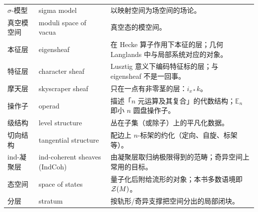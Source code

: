 \begin{longtable}{p{}p{}p{}}
$\sigma$-模型 & sigma model & 以映射空间为场空间的场论。\\
真空模空间 & moduli space of vacua & 真空态的模空间。\\
本征层 & eigensheaf & 在 Hecke 算子作用下本征的层；几何 Langlands 中与局部系统对应的对象。\\
特征层 & character sheaf & Lusztig 意义下编码特征标的层；与 eigensheaf 不是一回事。\\
摩天层 & skyscraper sheaf & 只在一点有非零茎的层：$i_{x*}k$。\\
操作子 & operad & 描述「$n$ 元运算及其复合」的代数结构；$\mathbb{E}_n$ 即小 $n$ 圆盘操作子。\\
级结构 & level structure & 丛在子集（或除子）上的平凡化数据。\\
切向结构 & tangential structure & 配边上 $n$-标架的约化（定向、自旋、标架等）。\\
ind-凝聚层 & ind-coherent sheaves (IndCoh) & 由凝聚层取归纳极限得到的范畴；奇异空间上常用的目标。\\
态空间 & space of states & 量子化后附给流形的对象；本书多数语境即 $\mathcal{Z}(M)$。\\
分层 & stratum & 按轨形/奇异支撑把空间分出的局部闭块。\\
\bottomrule
\end{longtable}
